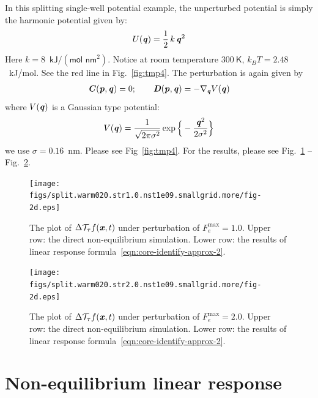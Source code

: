\documentclass[aip,jcp,a4paper,reprint,onecolumn]{revtex4-1}
\newcommand{\vect}[1]{\textbf{\textit{#1}}}
\newcommand{\mt}{\mathcal T}
\begin{document}
In this splitting single-well potential example, the unperturbed
potential is simply the harmonic potential given by:
\begin{align}
  U(\vect q) = \frac12\,k\,\vect q^2 
\end{align}
Here $k = 8$~$\textsf{kJ} / (\textsf{mol nm}^2)$.
Notice at room temperature $300\ \textsf{K}$, $k_BT = 2.48$~\textsf{kJ/mol}.
See the red line in Fig.~\ref{fig:tmp4}.
The perturbation is again given by
\begin{align}
  \vect C(\vect p, \vect q) = 0; \qquad
  \vect D(\vect p, \vect q) = -\nabla_{\vect q} V(\vect q) 
\end{align}
where $V(\vect q)$ is a Gaussian type potential:
\begin{align}
  V(\vect q) = \frac{1}{\sqrt{2\pi \sigma^2}}
  \exp\Big\{-\frac{\vect q^2}{2\sigma^2}\Big\}
\end{align}
we use $\sigma = 0.16$~\textsf{nm}. Please see Fig~\ref{fig:tmp4}.
For the results, please see Fig.~\ref{fig:tmp5} -- Fig.~\ref{fig:tmp6}.
\begin{figure}
  \centering
  \texttt{[image: figs/split.warm020.str1.0.nst1e09.smallgrid.more/fig-2d.eps]}
  \caption{The plot of $\Delta\mt_\tau f(\vect x,t)$  under perturbation of
    $F_e^{\textrm{max}} = 1.0$.
    Upper row: the direct non-equilibrium simulation. Lower row: the
    results of linear response formula~\eqref{eqn:core-identify-approx-2}.
  }
  \label{fig:tmp5}
\end{figure}

\begin{figure}
  \centering
  \texttt{[image: figs/split.warm020.str2.0.nst1e09.smallgrid.more/fig-2d.eps]}
  \caption{The plot of $\Delta\mt_\tau f(\vect x,t)$  under perturbation of
    $F_e^{\textrm{max}} = 2.0$.  Upper row: the direct non-equilibrium
    simulation. Lower row: the results of linear response
    formula~\eqref{eqn:core-identify-approx-2}.  }
  \label{fig:tmp6}
\end{figure}



\section{Non-equilibrium linear response}
\end{document}

